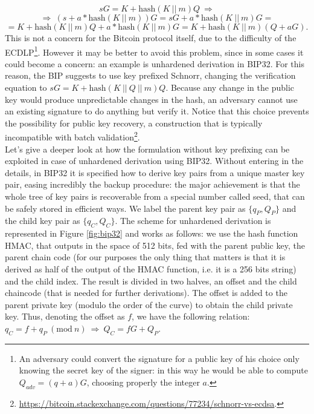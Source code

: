 $$sG = K + \text{hash}(K \ || \ m)Q \ \Longrightarrow$$
$$\Longrightarrow \ (s + a*\text{hash}(K \ || \ m))G = sG + a*\text{hash}(K \ || \ m)G =$$
$$= K + \text{hash}(K \ || \ m)Q + a*\text{hash}(K \ || \ m)G = K + \text{hash}(K \ || \ m)(Q + aG).$$
This is not a concern for the Bitcoin protocol itself, due to the difficulty of the ECDLP\footnote{An adversary could convert the signature for a public key of his choice only knowing the secret key of the signer: in this way he would be able to compute $Q_{adv} = (q + a)G$, choosing properly the integer $a$.}. However it may be better to avoid this problem, since in some cases it could become a concern: an example is unhardened derivation in BIP32. For this reason, the BIP suggests to use key prefixed Schnorr, changing the verification equation to $sG = K + \text{hash}(K \ || \ Q \ || \ m)Q$. Because any change in the public key would produce unpredictable changes in the hash, an adversary cannot use an existing signature to do anything but verify it. Notice that this choice prevents the possibility for public key recovery, a construction that is typically incompatible with batch validation\footnote{\url{https://bitcoin.stackexchange.com/questions/77234/schnorr-vs-ecdsa}.}.
\\
Let's give a deeper look at how the formulation without key prefixing can be exploited in case of unhardened derivation using BIP32. Without entering in the details, in BIP32 it is specified how to derive key pairs from a unique master key pair, easing incredibly the backup procedure: the major achievement is that the whole tree of key pairs is recoverable from a special number called seed, that can be safely stored in efficient ways. We label the parent key pair as $\{q_P, Q_P\}$ and the child key pair as $\{q_C, Q_C\}$. The scheme for unhardened derivation is represented in Figure \ref{fig:bip32} and works as follows: we use the hash function HMAC, that outputs in the space of 512 bits, fed with the parent public key, the parent chain code (for our purposes the only thing that matters is that it is derived as half of the output of the HMAC function, i.e. it is a 256 bits string) and the child index. The result is divided in two halves, an offset and the child chaincode (that is needed for further derivations). The offset is added to the parent private key (modulo the order of the curve) to obtain the child private key. Thus, denoting the offset as $f$, we have the following relation: $q_C = f + q_P \ (\text{mod} \ n) \ \Longrightarrow \ Q_C = fG + Q_P$.

